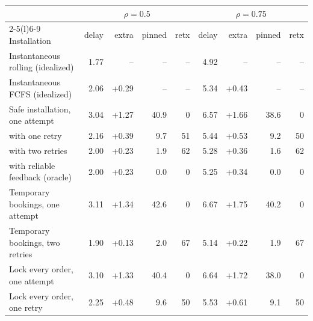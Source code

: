 \begin{tabular}{@{}lrrrrrrrr@{}}\toprule
& \multicolumn{4}{c}{$\rho=0.5$} & \multicolumn{4}{c}{$\rho=0.75$}\\\cmidrule(lr){2-5}\cmidrule(l){6-9}
Installation & delay & extra & pinned & retx & delay & extra & pinned & retx\\\midrule
Instantaneous rolling (idealized) & 1.77 & -- & -- & -- & 4.92 & -- & -- & --\\
Instantaneous FCFS (idealized) & 2.06 & +0.29 & -- & -- & 5.34 & +0.43 & -- & --\\
\addlinespace
Safe installation, one attempt & 3.04 & +1.27 & 40.9 & 0 & 6.57 & +1.66 & 38.6 & 0\\
\quad with one retry & 2.16 & +0.39 & 9.7 & 51 & 5.44 & +0.53 & 9.2 & 50\\
\quad with two retries & 2.00 & +0.23 & 1.9 & 62 & 5.28 & +0.36 & 1.6 & 62\\
\quad with reliable feedback (oracle) & 2.00 & +0.23 & 0.0 & 0 & 5.25 & +0.34 & 0.0 & 0\\
\addlinespace
Temporary bookings, one attempt & 3.11 & +1.34 & 42.6 & 0 & 6.67 & +1.75 & 40.2 & 0\\
Temporary bookings, two retries & 1.90 & +0.13 & 2.0 & 67 & 5.14 & +0.22 & 1.9 & 67\\
Lock every order, one attempt & 3.10 & +1.33 & 40.4 & 0 & 6.64 & +1.72 & 38.0 & 0\\
Lock every order, one retry & 2.25 & +0.48 & 9.6 & 50 & 5.53 & +0.61 & 9.1 & 50\\
\bottomrule\end{tabular}
